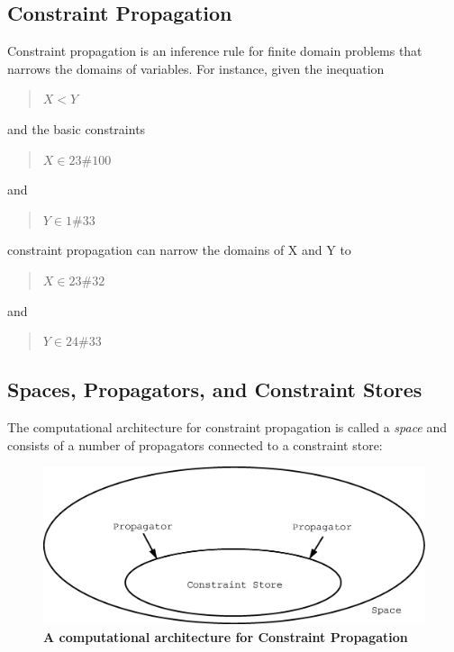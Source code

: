 \documentclass[a4paper]{scrartcl}
\begin{document}
\subsection{Constraint Propagation}
\label{section2-2}
Constraint propagation is an inference rule for finite domain 
problems that narrows the domains 
of variables. For instance, given the inequation\\
\begin{quote}
$ X < Y $
\end{quote}
and the basic constraints\\
\begin{quote}
$ X \in 23\#100 $
\end{quote}
and
\begin{quote}
$ Y \in 1\#33 $
\end{quote}
constraint propagation can narrow the domains of X and Y to\\
\begin{quote}
$ X \in 23\#32 $
\end{quote}
and
\begin{quote}
$ Y \in 24\#33 $
\end{quote}

\subsection{Spaces, Propagators, and Constraint Stores}
The computational architecture for constraint propagation is 
called a {\it space}\label{space} and consists 
of a number of propagators connected to a constraint store:\\


\begin{figure}[htpb]

\centerline{
\includegraphics*[scale=0.4]{figs/cp_2_new.eps}}
\caption{{\bf A computational architecture for Constraint Propagation}}
\label{figure1}
\end{figure}
\end{document}
